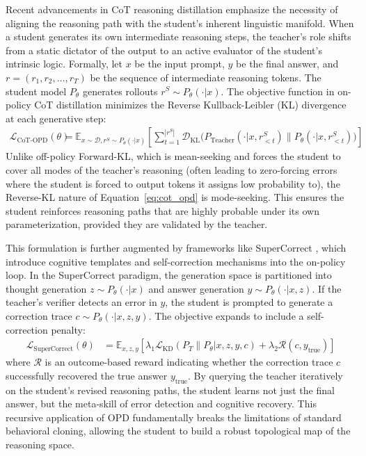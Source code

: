 \documentclass{article} %
\begin{document}
Recent advancements in CoT reasoning distillation \citep{2402.00857, 2405.04434} emphasize the necessity of aligning the reasoning path with the student's inherent linguistic manifold. When a student generates its own intermediate reasoning steps, the teacher's role shifts from a static dictator of the output to an active evaluator of the student's intrinsic logic. Formally, let $x$ be the input prompt, $y$ be the final answer, and $r = (r_1, r_2, \dots, r_T)$ be the sequence of intermediate reasoning tokens. The student model $P_\theta$ generates rollouts $r^S \sim P_\theta(\cdot | x)$. The objective function in on-policy CoT distillation minimizes the Reverse Kullback-Leibler (KL) divergence at each generative step:
\begin{align}
\mathcal{L}_{\text{CoT-OPD}}(\theta) &= \mathbb{E}_{x \sim \mathcal{D}, r^S \sim P_\theta(\cdot|x)} \left[ \sum_{t=1}^{|r^S|} \mathcal{D}_{\text{KL}} \Big( P_{\text{Teacher}}(\cdot | x, r^S_{<t}) \parallel P_\theta(\cdot | x, r^S_{<t}) \Big) \right] \label{eq:cot_opd}
\end{align}
Unlike off-policy Forward-KL, which is mean-seeking and forces the student to cover all modes of the teacher's reasoning (often leading to zero-forcing errors where the student is forced to output tokens it assigns low probability to), the Reverse-KL nature of Equation~\ref{eq:cot_opd} is mode-seeking. This ensures the student reinforces reasoning paths that are highly probable under its own parameterization, provided they are validated by the teacher.

This formulation is further augmented by frameworks like SuperCorrect \citep{2410.09008}, which introduce cognitive templates and self-correction mechanisms into the on-policy loop. In the SuperCorrect paradigm, the generation space is partitioned into thought generation $z \sim P_\theta(\cdot|x)$ and answer generation $y \sim P_\theta(\cdot|x, z)$. If the teacher's verifier detects an error in $y$, the student is prompted to generate a correction trace $c \sim P_\theta(\cdot|x, z, y)$. The objective expands to include a self-correction penalty:
\begin{align}
\mathcal{L}_{\text{SuperCorrect}}(\theta) &= \mathbb{E}_{x, z, y} \left[ \lambda_1 \mathcal{L}_{\text{KD}}(P_T \parallel P_\theta | x, z, y, c) + \lambda_2 \mathcal{R}(c, y_{\text{true}}) \right]
\end{align}
where $\mathcal{R}$ is an outcome-based reward indicating whether the correction trace $c$ successfully recovered the true answer $y_{\text{true}}$. By querying the teacher iteratively on the student's revised reasoning paths, the student learns not just the final answer, but the meta-skill of error detection and cognitive recovery. This recursive application of OPD fundamentally breaks the limitations of standard behavioral cloning, allowing the student to build a robust topological map of the reasoning space.
\end{document}
